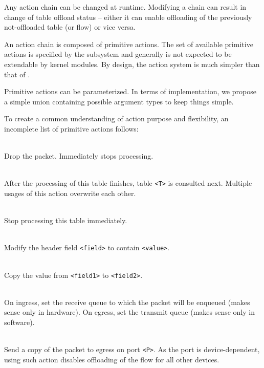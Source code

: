 Any action chain can be changed at runtime. Modifying a chain can result in
change of table offload status -- either it can enable offloading of the previously
not-offloaded table (or flow) or vice versa.

An action chain is composed of primitive actions. The set of available
primitive actions is specified by the subsystem and generally is not
expected to be extendable by kernel modules. By design, the action system is
much simpler than that of .

Primitive actions can be parameterized. In terms of implementation, we propose
a simple union containing possible argument types to keep things simple.

To create a common understanding of action purpose and flexibility, an
incomplete list of primitive actions follows:

\newcommand{\act}[1]{\texttt{#1}}
\begin{description}[noitemsep]
\item[\act{drop}] \hfill \\
	Drop the packet. Immediately stops processing.
\item[\act{set next table <T>}] \hfill \\
	After the processing of this table finishes, table \texttt{<T>} is
consulted next. Multiple usages of this action overwrite each other.
\item[\act{stop}] \hfill \\
	Stop processing this table immediately.
\item[\act{set field <field> <value>}] \hfill \\
	Modify the header field \texttt{<field>} to contain \texttt{<value>}.
\item[\act{copy value <field1> <field2>}] \hfill \\
	Copy the value from \texttt{<field1>} to \texttt{<field2>}.
\item[\act{set queue <Q>}] \hfill \\
	On ingress, set the receive queue to which the packet will be enqueued
	(makes sense only in hardware). On egress, set the transmit queue (makes
	sense only in software).
\item[\act{mirror to port <P>}] \hfill \\
	Send a copy of the packet to egress on port \texttt{<P>}. As the port is
	device-dependent, using such action disables offloading of the flow for all
	other devices.
\end{description}

